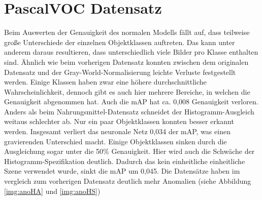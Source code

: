 \section{PascalVOC Datensatz}
Beim Auswerten der Genauigkeit des normalen Modells fällt auf, dass teilweise große Unterschiede der einzelnen Objektklassen auftreten. Das kann unter anderem daraus resultieren, dass unterschiedlich viele Bilder pro Klasse enthalten sind. Ähnlich wie beim vorherigen Datensatz konnten zwischen dem originalen Datensatz und der Gray-World-Normalisierung leichte Verluste festgestellt werden. Einige Klassen haben zwar eine höhere durchschnittliche Wahrscheinlichkeit, dennoch gibt es auch hier mehrere Bereiche, in welchen die Genauigkeit abgenommen hat. Auch die mAP hat ca. 0,008 Genauigkeit verloren. Anders als beim Nahrungsmittel-Datensatz schneidet der Histogramm-Ausgleich weitaus schlechter ab. Nur ein paar Objektklassen konnten besser erkannt werden. Insgesamt verliert das neuronale Netz 0,034 der mAP, was einen gravierenden Unterschied macht. Einige Objektklassen sinken durch die Ausgleichung sogar unter die 50\% Genauigkeit. Hier wird auch die Schwäche der Histogramm-Spezifikation deutlich. Dadurch das kein einheitliche einheitliche Szene verwendet wurde, sinkt die mAP um 0,045. Die Datensätze haben im vergleich zum vorherigen Datensatz deutlich mehr Anomalien (siehe Abbildung \ref{img:anoHA} und \ref{img:anoHS})
